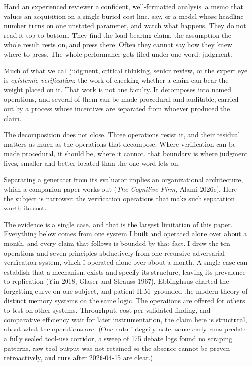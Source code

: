 \documentclass[
  11pt,
]{article}
\begin{document}
Hand an experienced reviewer a confident, well-formatted analysis, a
memo that values an acquisition on a single buried cost line, say, or a
model whose headline number turns on one unstated parameter, and
watch what happens. They do not read it top to bottom. They find the
load-bearing claim, the assumption the whole result rests on, and press
there. Often they cannot say how they knew where to press. The whole
performance gets filed under one word: judgment.

Much of what we call judgment, critical
thinking, senior review, or the expert eye is \emph{epistemic
verification}: the work of checking whether a claim can bear the weight
placed on it. That work is not one faculty. It decomposes into named
operations, and several of them can be made procedural and auditable,
carried out by a process whose incentives are separated from whoever
produced the claim.

The decomposition does not close. Three operations resist it, and their
residual matters as much as the operations that decompose. Where
verification can be made procedural, it should be, where it cannot, that
boundary is where judgment lives, smaller and better located than the one
word lets on.

Separating a generator from its evaluator implies an organizational
architecture, which a companion paper works out (\emph{The Cognitive
Firm}, Alami 2026c). Here the subject is narrower: the verification
operations that make such separation worth its cost.

The evidence is a single case, and that is the largest limitation of this paper. Everything below comes from one system I built and operated alone over about a month, and every claim that follows is bounded by that fact. I drew the ten operations and seven
principles abductively from one recursive adversarial verification system,
which I operated alone over about a month. A single case can establish
that a mechanism exists and specify its structure, leaving its
prevalence to replication (Yin 2018, Glaser and Strauss 1967), Ebbinghaus
charted the forgetting curve on one subject, and patient H.M. grounded the
modern theory of distinct memory systems on the same logic. The operations
are offered for others to test on other systems. Throughput, cost per
validated finding, and comparative efficiency wait for later
instrumentation, the claim here is structural, about what the operations
are. (One data-integrity note: some early runs predate a fully sealed
tool-use corridor, a sweep of 175 debate logs found no scraping patterns,
raw tool output was not retained so the absence cannot be proven
retroactively, and runs after 2026-04-15 are clear.)
\end{document}
